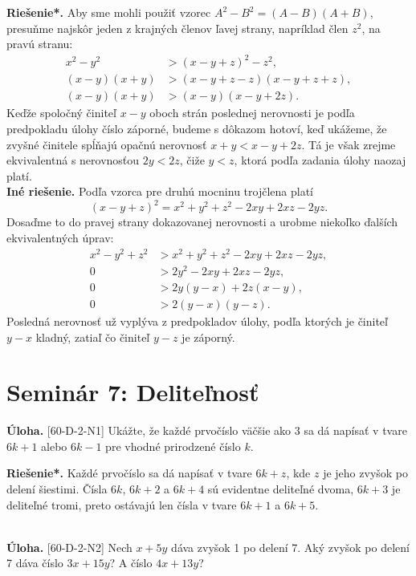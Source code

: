 \documentclass[11pt,a4paper,oneside,final]{book}
\newcommand{\ul}{\textbf{Úloha.} }
\newcommand{\rieh}{\textbf{Riešenie*.} }
\begin{document}
\rieh Aby sme mohli použiť vzorec $A^2 - B^2 = (A - B)(A + B)$, presuňme najskôr jeden z krajných členov ľavej strany, napríklad člen $z^2$, na pravú stranu:
\begin{align*}
x^2 - y^2 & > (x - y + z)^2-z^2,\\
(x - y)(x + y) & > (x - y + z - z)(x - y + z + z),\\
(x - y)(x + y) & > (x - y)(x - y + 2z).
\end{align*}
Keďže spoločný činiteľ $x - y$ oboch strán poslednej nerovnosti je podľa predpokladu úlohy číslo záporné, budeme s dôkazom hotoví, keď ukážeme, že zvyšné činitele spĺňajú opačnú nerovnosť $x + y < x - y + 2z$. Tá je však zrejme ekvivalentná s nerovnosťou $2y < 2z$, čiže $y < z$, ktorá podľa zadania úlohy naozaj platí.\\

\textbf{Iné riešenie.} Podľa vzorca pre druhú mocninu trojčlena platí $$(x - y + z)^2= x^2+ y^2+ z^2 - 2xy + 2xz - 2yz.$$
Dosaďme to do pravej strany dokazovanej nerovnosti a urobme niekoľko ďalších ekvivalentných úprav:
\begin{align*}
x^2 - y^2+ z^2 &> x^2+ y^2+ z^2 - 2xy + 2xz - 2yz,\\
0 &> 2y^2 - 2xy + 2xz - 2yz,\\
0 &>  2y(y - x) + 2z(x - y),\\
0 &> 2(y - x)(y - z).
\end{align*}
Posledná nerovnosť už vyplýva z predpokladov úlohy, podľa ktorých je činiteľ $y - x$ kladný, zatiaľ čo činiteľ $y - z$ je záporný.
\section*{Seminár 7: Deliteľnosť}
\begin{tcolorbox}[breakable,notitle,boxrule=0pt,colback=light-gray,colframe=light-gray]\ul [60-D-2-N1] Ukážte, že každé prvočíslo väčšie ako 3 sa dá napísať v tvare $6k + 1$ alebo $6k - 1$ pre vhodné prirodzené číslo $k$.

\end{tcolorbox}

\rieh Každé prvočíslo sa dá napísať v tvare $6k + z$, kde $z$ je jeho zvyšok po delení šiestimi. Čísla $6k$, $6k +2$ a $6k +4$ sú evidentne deliteľné dvoma, $6k +3$ je deliteľné tromi, preto ostávajú len čísla v tvare $6k + 1$ a $6k + 5$.\\
\\
\begin{tcolorbox}[breakable,notitle,boxrule=0pt,colback=light-gray,colframe=light-gray]\ul [60-D-2-N2] Nech $x + 5y$ dáva zvyšok 1 po delení 7. Aký zvyšok po delení 7 dáva číslo $3x + 15y$? A číslo $4x + 13y$?

\end{tcolorbox}
\end{document}
